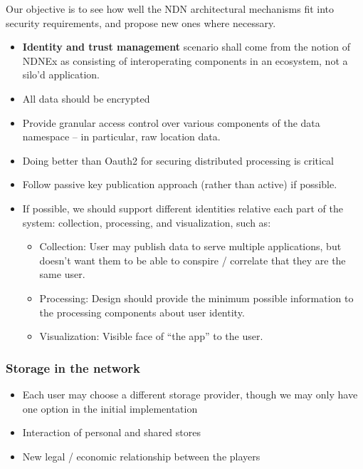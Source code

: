 Our objective is to see how well the NDN architectural mechanisms fit into security requirements, and propose new ones where necessary. 
\begin{itemize}
\item \textbf{Identity and trust management} scenario shall come from the notion of NDNEx as consisting of interoperating components in an ecosystem, not a silo'd application. 
\item All data should be encrypted
\item Provide granular access control over various components of the data namespace – in particular, raw location data.  
\item Doing better than Oauth2 for securing distributed processing is critical
\item Follow passive key publication approach (rather than active) if possible. 
\item If possible, we should support different identities relative each part of the system: collection, processing, and visualization, such as:
    \begin{itemize}
    \item Collection: User may publish data to serve multiple applications, but doesn’t want them to be able to conspire / correlate that they are the same user.
    \item Processing:  Design should provide the minimum possible information to the processing components about user identity. 
    \item Visualization: Visible face of “the app” to the user. 
    \end{itemize}
\end{itemize}

\subsubsection{Storage in the network}
\begin{itemize}
\item Each user may choose a different storage provider, though we may only have one option in the initial implementation
\item Interaction of personal and shared stores
\item New legal / economic relationship between the players
\end{itemize}
